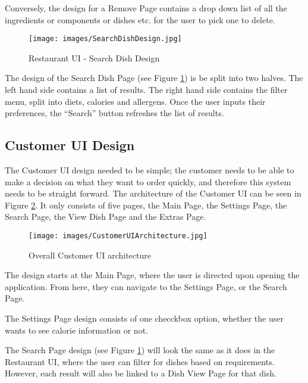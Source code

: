 Conversely, the design for a Remove Page contains a drop down list of all the ingredients or components or dishes etc. for the user to pick one to delete.

\begin{figure}[h]
    \centering
    \captionsetup{justification=centering}
    \texttt{[image: images/SearchDishDesign.jpg]}
    \caption{Restaurant UI - Search Dish Design}
    \label{fig:restaurantUI_query_page_design}
\end{figure}

The design of the Search Dish Page (see Figure \ref{fig:restaurantUI_query_page_design}) is be split into two halves. The left hand side contains a list of results. The right hand side contains the filter menu, split into diets, calories and allergens. Once the user inputs their preferences, the ``Search'' button refreshes the list of results.

\subsection{Customer UI Design}

The Customer UI design needed to be simple; the customer needs to be able to make a decision on what they want to order quickly, and therefore this system needs to be straight forward. The architecture of the Customer UI can be seen in Figure \ref{fig:customerUI_architecture}. It only consists of five pages, the Main Page, the Settings Page, the Search Page, the View Dish Page and the Extras Page.

\begin{figure}[h]
    \centering
    \captionsetup{justification=centering}
    \texttt{[image: images/CustomerUIArchitecture.jpg]}
    \caption{Overall Customer UI architecture}
    \label{fig:customerUI_architecture}
\end{figure}

The design starts at the Main Page, where the user is directed upon opening the application. From here, they can navigate to the Settings Page, or the Search Page. 

The Settings Page design consists of one checckbox option, whether the user wants to see calorie information or not.

The Search Page design (see Figure \ref{fig:restaurantUI_query_page_design}) will look the same as it does in the Restaurant UI, where the user can filter for dishes based on requirements. However, each result will also be linked to a Dish View Page for that dish.

